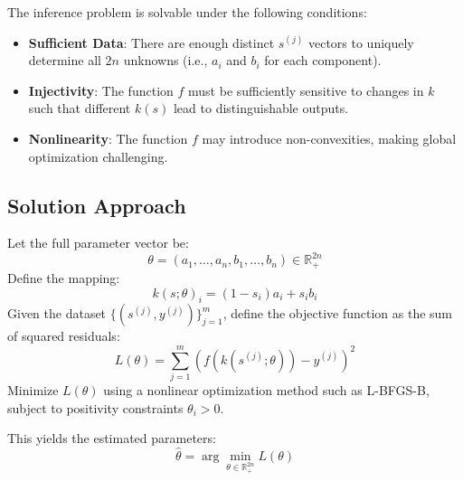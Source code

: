 \documentclass{article}
\begin{document}
The inference problem is solvable under the following conditions:
\begin{itemize}
    \item \textbf{Sufficient Data}: There are enough distinct \( s^{(j)} \) vectors to uniquely determine all \( 2n \) unknowns (i.e., \( a_i \) and \( b_i \) for each component).
    \item \textbf{Injectivity}: The function \( f \) must be sufficiently sensitive to changes in \( k \) such that different \( k(s) \) lead to distinguishable outputs.
    \item \textbf{Nonlinearity}: The function \( f \) may introduce non-convexities, making global optimization challenging.
\end{itemize}

\subsection*{Solution Approach}

Let the full parameter vector be:
\[
\theta = (a_1, \dots, a_n, b_1, \dots, b_n) \in \mathbb{R}_+^{2n}
\]
Define the mapping:
\[
k(s; \theta)_i = (1 - s_i) a_i + s_i b_i
\]
Given the dataset \( \{(s^{(j)}, y^{(j)})\}_{j=1}^m \), define the objective function as the sum of squared residuals:
\[
L(\theta) = \sum_{j=1}^m \left( f(k(s^{(j)}; \theta)) - y^{(j)} \right)^2
\]
Minimize \( L(\theta) \) using a nonlinear optimization method such as L-BFGS-B, subject to positivity constraints \( \theta_i > 0 \).

This yields the estimated parameters:
\[
\hat{\theta} = \arg\min_{\theta \in \mathbb{R}_+^{2n}} L(\theta)
\]
\end{document}
